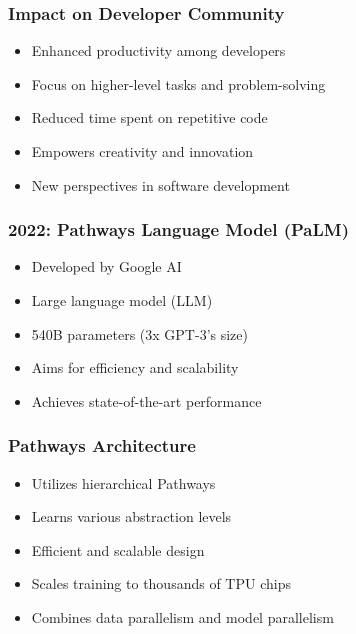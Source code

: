 \begin{frame}[fragile]\frametitle{Impact on Developer Community}
    
    \begin{itemize}
        \item Enhanced productivity among developers
        \item Focus on higher-level tasks and problem-solving
        \item Reduced time spent on repetitive code
        \item Empowers creativity and innovation
        \item New perspectives in software development
    \end{itemize}
\end{frame}

\begin{frame}[fragile]\frametitle{2022: Pathways Language Model (PaLM)}
    
    \begin{itemize}
        \item Developed by Google AI
        \item Large language model (LLM)
        \item 540B parameters (3x GPT-3's size)
        \item Aims for efficiency and scalability
        \item Achieves state-of-the-art performance
    \end{itemize}
\end{frame}

\begin{frame}[fragile]\frametitle{Pathways Architecture}
    
    \begin{itemize}
        \item Utilizes hierarchical Pathways
        \item Learns various abstraction levels
        \item Efficient and scalable design
        \item Scales training to thousands of TPU chips
        \item Combines data parallelism and model parallelism
    \end{itemize}
\end{frame}

